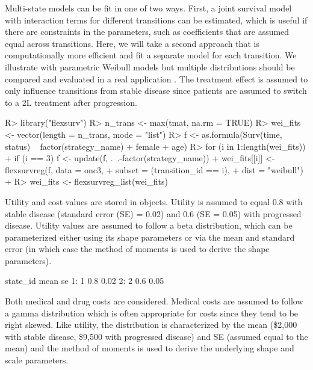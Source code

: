 \documentclass[article, nojss]{jss}\usepackage[]{graphicx}\usepackage[]{color}
\begin{document}
Multi-state models can be fit in one of two ways. First, a joint survival model with interaction terms for different transitions can be estimated, which is useful if there are constraints in the parameters, such as coefficients that are assumed equal across transitions. Here, we will take a second approach that is computationally more efficient and fit a separate model for each transition. We illustrate with parametric Weibull models but multiple distributions should be compared and evaluated in a real application \citep{williams2017cost}. The treatment effect is assumed to only influence transitions from stable disease since patients are assumed to switch to a 2L treatment after progression.

\begin{Schunk}
\begin{Sinput}
R> library("flexsurv")
R> n_trans <- max(tmat, na.rm = TRUE) 
R> wei_fits <- vector(length = n_trans, mode = "list")
R> f <- as.formula(Surv(time, status) ~ factor(strategy_name) + female + age)
R> for (i in 1:length(wei_fits)){
+    if (i == 3) f <- update(f, .~.-factor(strategy_name)) 
+    wei_fits[[i]] <- flexsurvreg(f, data = onc3, 
+                                 subset = (transition_id == i),
+                                 dist = "weibull")
+  }
R> wei_fits <- flexsurvreg_list(wei_fits)
\end{Sinput}
\end{Schunk}

Utility and cost values are stored in  objects. Utility is assumed to equal 0.8 with stable disease (standard error (SE) = 0.02) and 0.6 (SE = 0.05) with progressed disease. Utility values are assumed to follow a beta distribution, which can be parameterized either using its shape parameters or via the mean and standard error (in which case the method of moments is used to derive the shape parameters).

\begin{Schunk}
\begin{Soutput}
   state_id mean   se
1:        1  0.8 0.02
2:        2  0.6 0.05
\end{Soutput}
\end{Schunk}

Both medical and drug costs are considered. Medical costs are assumed to follow a gamma distribution which is often appropriate for costs since they tend to be right skewed. Like utility, the distribution is characterized by the mean (\$2,000 with stable disease, \$9,500 with progressed disease) and SE (assumed equal to the mean) and the method of moments is used to derive the underlying shape and scale parameters.
\end{document}
